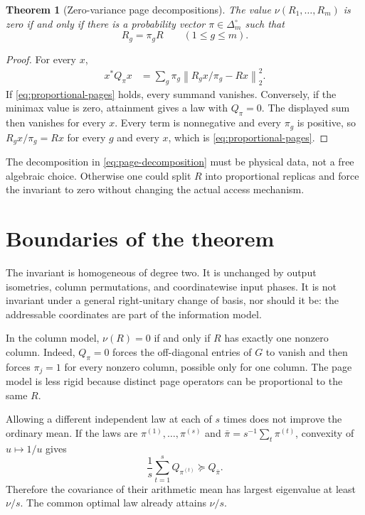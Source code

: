 \documentclass[11pt]{article}
\newtheorem{theorem}{Theorem}[section]
\theoremstyle{definition}
\newcommand{\norm}[1]{\left\lVert #1\right\rVert}
\begin{document}
\begin{theorem}[Zero-variance page decompositions]
\label{thm:page-zero}
The value $\nu(R_1,\ldots,R_m)$ is zero if and only if there is a probability vector
$\pi\in\Delta_m^\circ$ such that
\begin{equation}
  R_g=\pi_gR\qquad(1\le g\le m).
  \label{eq:proportional-pages}
\end{equation}
\end{theorem}

\begin{proof}
For every $x$,
\begin{align*}
  x^*Q_\pi x
  &=\sum_g\pi_g
  \norm{R_gx/\pi_g-Rx}_2^2.
\end{align*}
If \eqref{eq:proportional-pages} holds, every summand vanishes.  Conversely, if the minimax value
is zero, attainment gives a law with $Q_\pi=0$.  The displayed sum then vanishes for every $x$.
Every term is nonnegative and every $\pi_g$ is positive, so
$R_gx/\pi_g=Rx$ for every $g$ and every $x$, which is \eqref{eq:proportional-pages}.
\end{proof}

The decomposition in \eqref{eq:page-decomposition} must be physical data, not a free algebraic
choice.  Otherwise one could split $R$ into proportional replicas and force the invariant to
zero without changing the actual access mechanism.

\section{Boundaries of the theorem}

The invariant is homogeneous of degree two.  It is unchanged by output isometries, column
permutations, and coordinatewise input phases.  It is not invariant under a general right-unitary
change of basis, nor should it be: the addressable coordinates are part of the information model.

In the column model, $\nu(R)=0$ if and only if $R$ has exactly one nonzero column.  Indeed,
$Q_\pi=0$ forces the off-diagonal entries of $G$ to vanish and then forces $\pi_j=1$ for every
nonzero column, possible only for one column.  The page model is less rigid because distinct page
operators can be proportional to the same $R$.

Allowing a different independent law at each of $s$ times does not improve the ordinary mean.
If the laws are $\pi^{(1)},\ldots,\pi^{(s)}$ and
$\bar\pi=s^{-1}\sum_t\pi^{(t)}$, convexity of $u\mapsto1/u$ gives
\[
  \frac1s\sum_{t=1}^sQ_{\pi^{(t)}}\succeq Q_{\bar\pi}.
\]
Therefore the covariance of their arithmetic mean has largest eigenvalue at least $\nu/s$.
The common optimal law already attains $\nu/s$.
\end{document}
